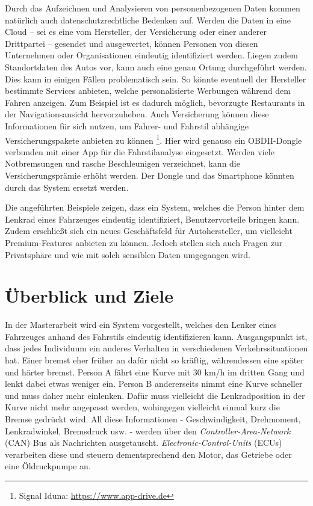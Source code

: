 Durch das Aufzeichnen und Analysieren von personenbezogenen Daten kommen natürlich auch datenschutzrechtliche Bedenken auf. Werden die Daten in eine Cloud – sei es eine vom Hersteller, der Versicherung oder einer anderer Drittpartei – gesendet und ausgewertet, können Personen von diesen Unternehmen oder Organisationen eindeutig identifiziert werden. Liegen zudem Standortdaten des Autos vor, kann auch eine genau Ortung durchgeführt werden. Dies kann in einigen Fällen problematisch sein. So könnte eventuell der Hersteller bestimmte Services anbieten, welche personalisierte Werbungen während dem Fahren anzeigen. Zum Beispiel ist es dadurch möglich, bevorzugte Restaurants in der Navigationsansicht hervorzuheben. Auch Versicherung können diese Informationen für sich nutzen, um Fahrer- und Fahrstil abhängige Versicherungspakete anbieten zu können \footnote{Signal Iduna: \url{https://www.app-drive.de}}. Hier wird genauso ein OBDII-Dongle verbunden mit einer App für die Fahrstilanalyse eingesetzt. Werden viele Notbremsungen und rasche Beschleunigen verzeichnet, kann die Versicherungsprämie erhöht werden. Der Dongle und das Smartphone könnten durch das System ersetzt werden.

Die angeführten Beispiele zeigen, dass ein System, welches die Person hinter dem Lenkrad eines Fahrzeuges eindeutig identifiziert, Benutzervorteile bringen kann. Zudem erschließt sich ein neues Geschäftsfeld für Autohersteller, um vielleicht Premium-Features anbieten zu können. Jedoch stellen sich auch Fragen zur Privatsphäre und wie mit solch sensiblen Daten umgegangen wird.

\section{Überblick und Ziele}
\label{sec:overview}

In der Masterarbeit wird ein System vorgestellt, welches den Lenker eines Fahrzeuges anhand des Fahrstils eindeutig identifizieren kann. Ausgangspunkt ist, dass jedes Individuum ein anderes Verhalten in verschiedenen Verkehrssituationen hat. Einer bremst eher früher an dafür nicht so kräftig, währendessen eine später und härter bremst. Person A fährt eine Kurve mit 30 km/h im dritten Gang und lenkt dabei etwas weniger ein. Person B andererseits nimmt eine Kurve schneller und muss daher mehr einlenken. Dafür muss vielleicht die Lenkradposition in der Kurve nicht mehr angepasst werden, wohingegen vielleicht einmal kurz die Bremse gedrückt wird. All diese Informationen - Geschwindigkeit, Drehmoment, Lenkradwinkel, Bremsdruck usw. - werden über den \textit{Controller-Area-Network} (CAN) Bus als Nachrichten ausgetauscht. \textit{Electronic-Control-Units} (ECUs) verarbeiten diese und steuern dementsprechend den Motor, das Getriebe oder eine Öldruckpumpe an.

